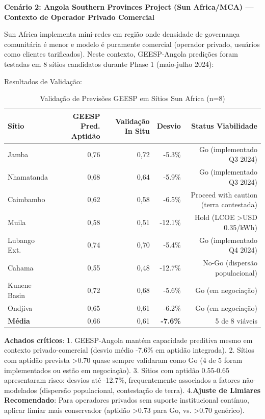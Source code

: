 \documentclass[12pt, a4paper]{article}
\begin{document}
\textbf{Cenário 2: Angola Southern Provinces Project (Sun Africa/MCA) — Contexto de Operador Privado Comercial}

Sun Africa implementa mini-redes em região onde densidade de governança comunitária é menor e modelo é puramente comercial (operador privado, usuários como clientes tarificados). Neste contexto, GEESP-Angola predições foram testadas em 8 sítios candidatos durante Phase 1 (maio-julho 2024):

Resultados de Validação:
\begin{table}[H]
\centering
\caption{Validação de Previsões GEESP em Sítios Sun Africa (n=8)}
\label{tab:geesp_validation_sun}
\footnotesize
\begin{tabular}{|l|r|r|r|r|}
\hline
\textbf{Sítio} & \textbf{GEESP Pred. Aptidão} & \textbf{Validação In Situ} & \textbf{Desvio} & \textbf{Status Viabilidade} \\
\hline
Jamba & 0,76 & 0,72 & -5.3\% & Go (implementado Q3 2024) \\
Nhamatanda & 0,68 & 0,64 & -5.9\% & Go (implementado Q3 2024) \\
Caimbambo & 0,62 & 0,58 & -6.5\% & Proceed with caution (terra contestada) \\
Muila & 0,58 & 0,51 & -12.1\% & Hold (LCOE >USD 0.35/kWh) \\
Lubango Ext. & 0,74 & 0,70 & -5.4\% & Go (implementado Q4 2024)\\
Cahama & 0,55 & 0,48 & -12.7\% & No-Go (dispersão populacional) \\
Kunene Basin & 0,72 & 0,68 & -5.6\% & Go (em negociação) \\
Ondjiva & 0,65 & 0,61 & -6.2\% & Go (em negociação) \\
\hline
\textbf{Média} & 0,66 & 0,61 & \textbf{-7.6\%} & 5 de 8 viáveis \\
\hline
\end{tabular}
\end{table}\textbf{Achados críticos}:
1. GEESP-Angola mantém capacidade preditiva mesmo em contexto privado-comercial (desvio médio -7.6\% em aptidão integrada).
2. Sítios com aptidão prevista >0.70 quase sempre validaram como Go (4 de 5 foram implementados ou estão em negociação).
3. Sítios com aptidão 0.55-0.65 apresentaram risco: desvios até -12.7\%, frequentemente associados a fatores não-modelados (dispersão populacional, contestação de terra).
4.\textbf{Ajuste de Limiares Recomendado}: Para operadores privados sem suporte institucional contínuo, aplicar limiar mais conservador (aptidão >0.73 para Go, vs. >0.70 genérico).
\end{document}
